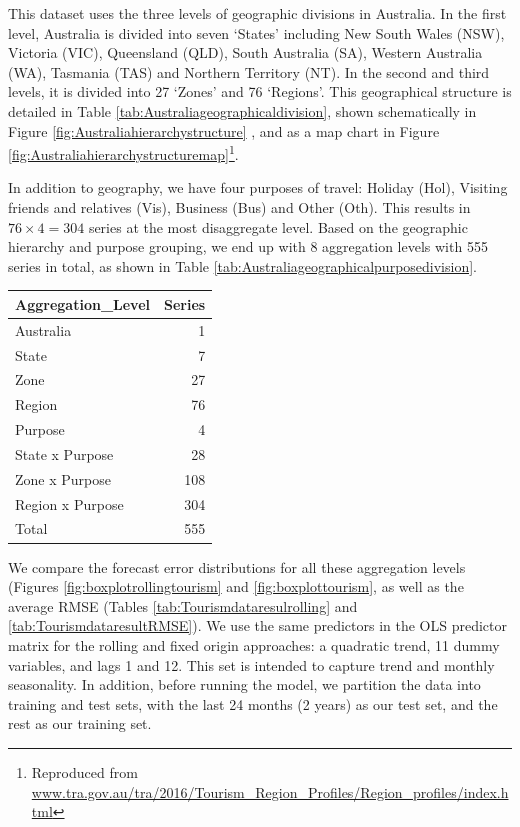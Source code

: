 \documentclass[11pt,a4paper,]{article}
\let\origtable\table
\let\endorigtable\endtable
\renewenvironment{table}[1][2] {
    \expandafter\origtable\expandafter[!htbp]
} {
    \endorigtable
}
\begin{document}
This dataset uses the three levels of geographic divisions in Australia. In the first level, Australia is divided into seven `States' including New South Wales (NSW), Victoria (VIC), Queensland (QLD), South Australia (SA), Western Australia (WA), Tasmania (TAS) and Northern Territory (NT). In the second and third levels, it is divided into 27 `Zones' and 76 `Regions'. This geographical structure is detailed in Table \ref{tab:Australiageographicaldivision}, shown schematically in Figure \ref{fig:Australiahierarchystructure} , and as a map chart in Figure \ref{fig:Australiahierarchystructuremap}\footnote{Reproduced from \url{www.tra.gov.au/tra/2016/Tourism_Region_Profiles/Region_profiles/index.html}}.

In addition to geography, we have four purposes of travel: Holiday (Hol), Visiting friends and relatives (Vis), Business (Bus) and Other (Oth). This results in \(76\times4 = 304\) series at the most disaggregate level. Based on the geographic hierarchy and purpose grouping, we end up with 8 aggregation levels with 555 series in total, as shown in Table \ref{tab:Australiageographicalpurposedivision}.

\begin{table}[!h]

\caption{\label{tab:Australiageographicalpurposedivision}Number of Australian domestic tourism series at each aggregation level.}
\centering
\begin{tabular}[t]{lr}
\toprule
Aggregation\_Level & Series\\
\midrule
Australia & 1\\
State & 7\\
Zone & 27\\
Region & 76\\
Purpose & 4\\
State x Purpose & 28\\
Zone x Purpose & 108\\
Region x Purpose & 304\\
\hline
Total & 555\\
\bottomrule
\end{tabular}
\end{table}

We compare the forecast error distributions for all these aggregation levels (Figures \ref{fig:boxplotrollingtourism} and \ref{fig:boxplottourism}, as well as the average RMSE (Tables \ref{tab:Tourismdataresulrolling} and \ref{tab:TourismdataresultRMSE}). We use the same predictors in the OLS predictor matrix for the rolling and fixed origin approaches: a quadratic trend, 11 dummy variables, and lags 1 and 12. This set is intended to capture trend and monthly seasonality. In addition, before running the model, we partition the data into training and test sets, with the last 24 months (2 years) as our test set, and the rest as our training set.
\end{document}
